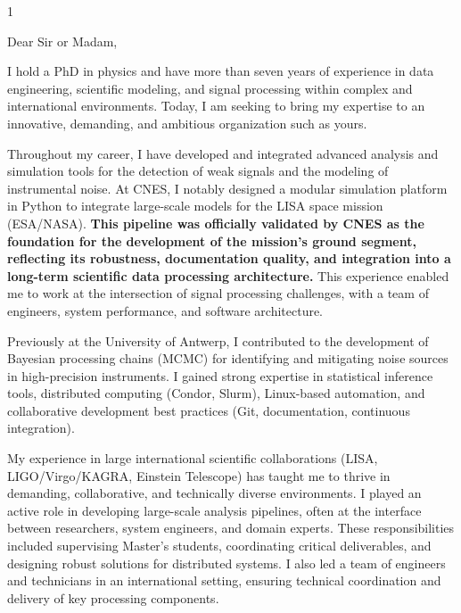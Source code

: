 \documentclass[10pt,a4paper]{altacv}
\begin{document}
\makecvheader


\begin{paracol}{1}



{\color{body}

Dear Sir or Madam,

I hold a PhD in physics and have more than seven years of experience in data engineering, scientific modeling, and signal processing within complex and international environments. Today, I am seeking to bring my expertise to an innovative, demanding, and ambitious organization such as yours.

Throughout my career, I have developed and integrated advanced analysis and simulation tools for the detection of weak signals and the modeling of instrumental noise. At CNES, I notably designed a modular simulation platform in Python to integrate large-scale models for the LISA space mission (ESA/NASA). \textbf{This pipeline was officially validated by CNES as the foundation for the development of the mission's ground segment, reflecting its robustness, documentation quality, and integration into a long-term scientific data processing architecture.} This experience enabled me to work at the intersection of signal processing challenges, with a team of engineers, system performance, and software architecture.

Previously at the University of Antwerp, I contributed to the development of Bayesian processing chains (MCMC) for identifying and mitigating noise sources in high-precision instruments. I gained strong expertise in statistical inference tools, distributed computing (Condor, Slurm), Linux-based automation, and collaborative development best practices (Git, documentation, continuous integration).

My experience in large international scientific collaborations (LISA, LIGO/Virgo/KAGRA, Einstein Telescope) has taught me to thrive in demanding, collaborative, and technically diverse environments. I played an active role in developing large-scale analysis pipelines, often at the interface between researchers, system engineers, and domain experts. These responsibilities included supervising Master’s students, coordinating critical deliverables, and designing robust solutions for distributed systems. I also led a team of engineers and technicians in an international setting, ensuring technical coordination and delivery of key processing components.

}
\end{paracol}
\end{document}
